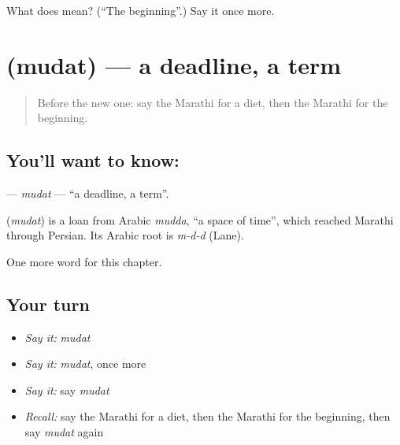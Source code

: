 \begin{tcolorbox}[breakable,colback=teal!4,colframe=teal!35!black,title={Before you move on}]
What does  mean? (\textquotedblleft{}The beginning\textquotedblright{}.) Say it once more.
\end{tcolorbox}
\section[\texorpdfstring{\mr{मुदत} (mudat)}{मुदत (mudat)}]{ (mudat) — a deadline, a term}

\label{lesson:MR-C230-mudat}



\begin{quote}
Before the new one: say the Marathi for a diet, then the Marathi for the beginning.
\end{quote}

\subsection*{You'll want to know: }
\textbf{} — \emph{mudat} — \textquotedblleft{}a deadline, a term\textquotedblright{}.

\begin{cousinweb}
\textbf{} (\emph{mudat}) is a loan from Arabic \emph{mudda}, \textquotedblleft{}a space of time\textquotedblright{}, which reached Marathi through Persian. Its Arabic root is \emph{m-d-d} (Lane).
\end{cousinweb}

\begin{grammarlens}[title={What you've built}]
One more word for this chapter.
\end{grammarlens}

\subsection*{Your turn}
\begin{itemize}
\raggedright
  \item \emph{Say it:} \emph{mudat}
  \item \emph{Say it:} \emph{mudat}, once more
  \item \emph{Say it:} say \emph{mudat}
  \item \emph{Recall:} say the Marathi for a diet, then the Marathi for the beginning, then say \emph{mudat} again
\end{itemize}

